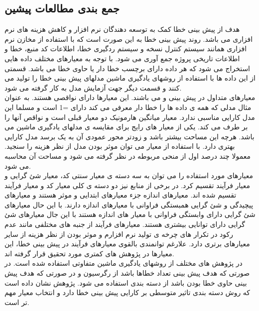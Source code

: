 \subsection{جمع بندی مطالعات پیشین}
هدف از پیش بینی خطا کمک به توسعه دهندگان نرم افزار و کاهش هزینه های نرم افزاری می باشد. روند پیش بینی خطا به این صورت است که با استفاده از مخازن نرم افزاری همانند سیستم کنترل نسخه و سیستم ردگیری خطا، اطلاعات کد منبع، خطا و اطلاعات تاریخی پروژه جمع آوری می شود. با توجه به معیارهای مختلف داده هایی استخراج می شود که هر داده دارای برچسب خطا دار یا حاوی خطا می باشد. قسمتی از این داده ها با استفاده از روشهای یادگیری ماشین مدلهای پیش بینی خطا را تولید می کنند و قسمت دیگر جهت آزمایش مدل به کار گرفته می شود.\\

معیارهای متداول در پیش بینی  و  می باشند. این معیارها دارای نواقصی هستند. به عنوان مثال مدلی که همه ی داده ها را خطا دار معرفی می کند دارای =1 است و مسلما این مدل کارایی مناسبی ندارد. معیار   میانگین هارمونیک دو معیار قبلی است و نواقص آنها را بر طرف می کند. یکی از معیار های رایج برای مقایسه ی مدلهای یادگیری ماشین  می باشد. هرچه این مساحت بیشتر باشد و زودتر محور عمودی آن به یک برسد مدل کارایی بهتری دارد. با استفاده از معیار  می توان موثر بودن مدل از نظر هزینه را سنجید. معمولا چند درصد اول از منحی مربوطه در نظر گرفته می شود و مساحت آن محاسبه می شود. \\

معیارهای مورد استفاده را می توان به سه دسته ی معیار سنتی کد، معیار شئ گرایی و معیار فرآیند تقسیم کرد. در برخی از منابع نیز دو دسته ی کلی معیار کد و معیار فرآیند تقسیم شده اند. معیارهای اندازه جزء معیارهای ابتدایی و موثر هستند و معیارهای پیچیدگی و شئ گرایی همبستگی فراوانی با معیارهای اندازه دارند. با این حال معیارهای شئ گرایی دارای وابستگی فراوانی با معیار های اندازه هستند با این جال معیارهای شئ گرایی دارای توانایی بیشتری هستند. معیارهای فرآیند از جنبه های مختلفی  مانند عدم رکود در تکرار های چرخه ی تولید نرم افزارم و موثر بودن از نظر هزینه از سایر معیارهای برتری دارد. علارغم توانمندی بالقوی معیارهای فرآیند در پیش بینی خطا، این معیارها در پژوهش های کمتری مورد تحقیق قرار گرفته اند. \\

در پژوهش های مختلف از روشهای یادگیری ماشین متفاوتی استفاده شده است. در صورتی که هدف پیش بینی تعداد خطاها باشد از رگرسیون و در صورتی که هدف پیش بینی حاوی خطا بودن باشد از دسته بندی استفاده می شود. پژوهش \cite{arisholm2010systematic}  نشان داده است که روش دسته بندی تاثیر متوسطی بر کارایی پیش بینی خطا دارد و انتخاب معیار مهم تر است. \\

